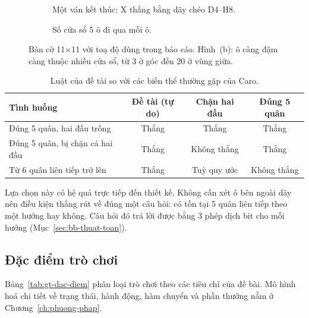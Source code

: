 \begin{figure}[!htb]
  \centering
  \begin{subfigure}[t]{.49\textwidth}
    \centering
    
    \caption{Một ván kết thúc: X thắng bằng dãy chéo D4--H8.}
  \end{subfigure}\hfill
  \begin{subfigure}[t]{.49\textwidth}
    \centering
    
    \caption{Số cửa sổ 5 ô đi qua mỗi ô.}
  \end{subfigure}
  \caption{Bàn cờ 11×11 với toạ độ dùng trong báo cáo. Hình~(b): ô càng đậm càng thuộc nhiều cửa sổ, từ 3 ở góc đến 20 ở vùng giữa.}
  \label{fig:gt-ban}
\end{figure}

\begin{table}[!htb]
  \centering\small
  \caption{Luật của đề tài so với các biến thể thường gặp của Caro.}
  \label{tab:gt-bien-the}
  \begin{tabularx}{\textwidth}{@{}X c c c@{}}
    \toprule
    \textbf{Tình huống} & \textbf{Đề tài (tự do)} & \textbf{Chặn hai đầu} & \textbf{Đúng 5 quân} \\
    \midrule
    Đúng 5 quân, hai đầu trống & Thắng & Thắng & Thắng \\
    Đúng 5 quân, bị chặn cả hai đầu & Thắng & Không thắng & Thắng \\
    Từ 6 quân liên tiếp trở lên & Thắng & Tuỳ quy ước & Không thắng \\
    \bottomrule
  \end{tabularx}
\end{table}

Lựa chọn này có hệ quả trực tiếp đến thiết kế. Không cần xét ô bên ngoài dãy nên điều kiện thắng rút về đúng một câu hỏi: có tồn tại 5 quân liên tiếp theo một hướng hay không. Câu hỏi đó trả lời được bằng 3 phép dịch bit cho mỗi hướng (Mục~\ref{sec:bb-thuat-toan}).

\subsection{Đặc điểm trò chơi}
\label{sec:gt-dac-diem}
Bảng~\ref{tab:gt-dac-diem} phân loại trò chơi theo các tiêu chí của đề bài. Mô hình hoá chi tiết về trạng thái, hành động, hàm chuyển và phần thưởng nằm ở Chương~\ref{ch:phuong-phap}.

